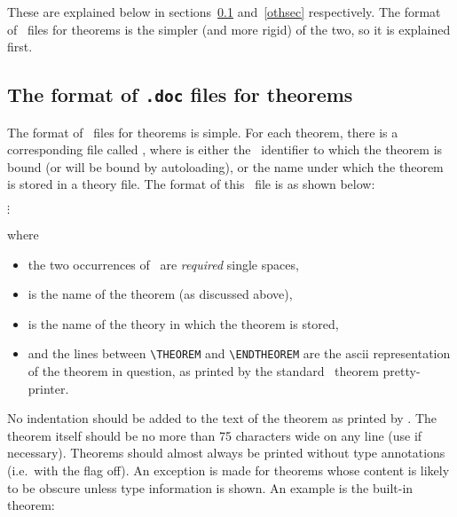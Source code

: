 \noindent These are explained below in sections~\ref{thsec} and~\ref{othsec}
respectively.  The format of \doc\ files for theorems is the simpler (and more
rigid) of the two, so it is explained first.

\subsection{The format of {\tt .doc} files for theorems}\label{thsec}

The format of \doc\ files for theorems is simple.  For each theorem, there is
a corresponding file called \doc, where  is either
the \ML\ identifier to which the theorem is bound (or will be bound by
autoloading), or the name under which the theorem is stored in a theory file.
The format of this \doc\ file is as shown below:

\smallskip

\begin{boxed}\begin{alltt}
\vsp{}\vsp{}
\(\vdots\)
\end{alltt}\end{boxed}

\smallskip

\noindent where

\begin{itemize}

\item the two occurrences of \vsp\ are {\it required\/} single spaces,

\item {} is the name of the theorem (as discussed above),

\item {} is the name of the theory in which the theorem is stored,

\item and the lines between {\small\verb!\THEOREM!} and
{\small\verb!\ENDTHEOREM!} are the ascii representation of the theorem in
question, as printed by the standard \HOL\ theorem pretty-printer.

\end{itemize}

\noindent No indentation should be added to the text of the theorem as printed
by \HOL.  The theorem itself should be no more than 75 characters wide on any
line (use  if necessary).  Theorems should almost always be
printed without type annotations (i.e.\ with the  flag off).
An exception is made for theorems whose content is likely to be obscure unless
type information is shown.  An example is the built-in theorem:

